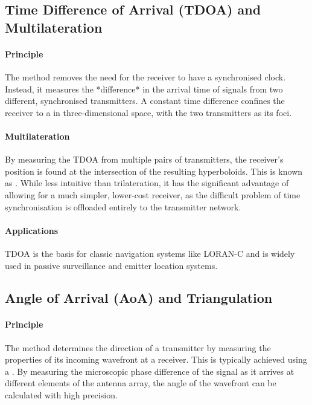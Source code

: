 \subsection{Time Difference of Arrival (TDOA) and Multilateration}

\paragraph{Principle}
The  method removes the need for the receiver to have a synchronised clock. Instead, it measures the *difference* in the arrival time of signals from two different, synchronised transmitters. A constant time difference confines the receiver to a  in three-dimensional space, with the two transmitters as its foci.

\paragraph{Multilateration}
By measuring the TDOA from multiple pairs of transmitters, the receiver's position is found at the intersection of the resulting hyperboloids. This is known as . While less intuitive than trilateration, it has the significant advantage of allowing for a much simpler, lower-cost receiver, as the difficult problem of time synchronisation is offloaded entirely to the transmitter network.

\paragraph{Applications}
TDOA is the basis for classic navigation systems like LORAN-C and is widely used in passive surveillance and emitter location systems.

\subsection{Angle of Arrival (AoA) and Triangulation}

\paragraph{Principle}
The  method determines the direction of a transmitter by measuring the properties of its incoming wavefront at a receiver. This is typically achieved using a . By measuring the microscopic phase difference of the signal as it arrives at different elements of the antenna array, the angle of the wavefront can be calculated with high precision.

